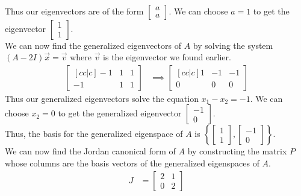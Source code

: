 \documentclass[answers,12pt,addpoints]{exam}
\begin{document}
\begin{questions}
\begin{solution}
\begin{align*}
        \end{align*}
        Thus our eigenvectors are of the form $\begin{bmatrix} a\\ a \end{bmatrix}$. We can choose $a = 1$ to get the eigenvector $\begin{bmatrix} 1\\ 1 \end{bmatrix}$. \\
        We can now find the generalized eigenvectors of $A$ by solving the system $(A - 2I)\vec{x} = \vec{v}$ where $\vec{v}$ is the eigenvector we found earlier.
        \begin{align*}
            \begin{bmatrix}[cc|c]
                -1 & 1 & 1 \\
                -1 & 1 & 1
            \end{bmatrix}
            &\implies
            \begin{bmatrix}[cc|c]
                1 & -1 & -1 \\
                0 & 0 & 0
            \end{bmatrix}
        \end{align*}
        Thus our generalized eigenvectors solve the equation $x_1 - x_2 =-1$. We can choose $x_2 = 0$ to get the generalized eigenvector $\begin{bmatrix} -1\\ 0 \end{bmatrix}$. \\
        Thus, the basis for the generalized eigenspace of $A$ is $\left\{ \begin{bmatrix} 1\\ 1 \end{bmatrix}, \begin{bmatrix} -1\\ 0 \end{bmatrix} \right\}$. \\
        We can now find the Jordan canonical form of $A$ by constructing the matrix $P$ whose columns are the basis vectors of the generalized eigenspaces of $A$.
        \begin{align*}
            J &= \begin{bmatrix}
                2 & 1 \\
                0 & 2
            \end{bmatrix}
        \end{align*}

\end{solution}
\end{questions}
\end{document}
